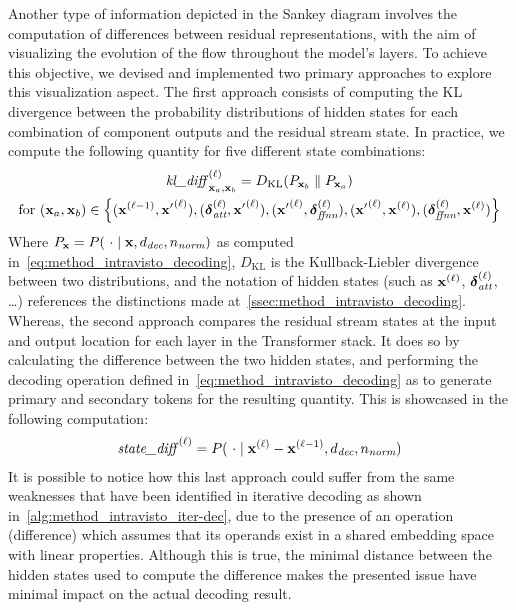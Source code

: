 Another type of information depicted in the Sankey diagram involves the computation of differences between residual representations, with the aim of visualizing the evolution of the flow throughout the model's layers.
To achieve this objective, we devised and implemented two primary approaches to explore this visualization aspect.
The first approach consists of computing the KL divergence between the probability distributions of hidden states for each combination of component outputs and the residual stream state.
In practice, we compute the following quantity for five different state combinations:
\begin{equation}
    \label{eq:method_intravisto_kl-diff}
    \begin{gathered}
        {\textit{kl\_diff}{\,}\strut}_{\bm{\mathbf{x}}_a, \bm{\mathbf{x}}_b}^{(\ell)} = D_{\text{KL}}(P_{\bm{\mathbf{x}}_b} \parallel P_{\bm{\mathbf{x}}_a}) \\
        \text{for} \ (\bm{\mathbf{x}}_a, \bm{\mathbf{x}}_b) \in \Bigl\{
            (\bm{\mathbf{x}}^{(\ell-1)}, {\bm{\mathbf{x}}'}^{(\ell)}), 
            (\bm{\mathbf{\delta}}_\textit{att}^{(\ell)}, {\bm{\mathbf{x}}'}^{(\ell)}), 
            ({\bm{\mathbf{x}}'}^{(\ell)}, \bm{\mathbf{\delta}}_\textit{ffnn}^{(\ell)}), 
            ({\bm{\mathbf{x}}'}^{(\ell)}, \bm{\mathbf{x}}^{(\ell)}), 
            (\bm{\mathbf{\delta}}_\textit{ffnn}^{(\ell)}, \bm{\mathbf{x}}^{(\ell)})
        \Bigr\}
    \end{gathered}
\end{equation}
Where $P_{\bm{\mathbf{x}}} = P(\ \cdot \mid \bm{\mathbf{x}}, d_\textit{dec}, n_\textit{norm})$ as computed in~\cref{eq:method_intravisto_decoding}, $D_{\text{KL}}$ is the Kullback-Liebler divergence between two distributions, and the notation of hidden states (such as $\bm{\mathbf{x}}^{(\ell)}$, $\bm{\mathbf{\delta}}_\textit{att}^{(\ell)}$, \ldots) references the distinctions made at~\cref{ssec:method_intravisto_decoding}.
Whereas, the second approach compares the residual stream states at the input and output location for each layer in the Transformer stack.
It does so by calculating the difference between the two hidden states, and performing the decoding operation defined in~\cref{eq:method_intravisto_decoding} as to generate primary and secondary tokens for the resulting quantity.
This is showcased in the following computation:
\begin{equation}
    \label{eq:method_intravisto_state-diff}
    {\textit{state\_diff}{\,}\strut}^{(\ell)} = P(\ \cdot \mid \bm{\mathbf{x}}^{(\ell)} - \bm{\mathbf{x}}^{(\ell - 1)}, d_\textit{dec}, n_\textit{norm})
\end{equation}
It is possible to notice how this last approach could suffer from the same weaknesses that have been identified in iterative decoding as shown in~\cref{alg:method_intravisto_iter-dec}, due to the presence of an operation (difference) which assumes that its operands exist in a shared embedding space with linear properties.
Although this is true, the minimal distance between the hidden states used to compute the difference makes the presented issue have minimal impact on the actual decoding result.

